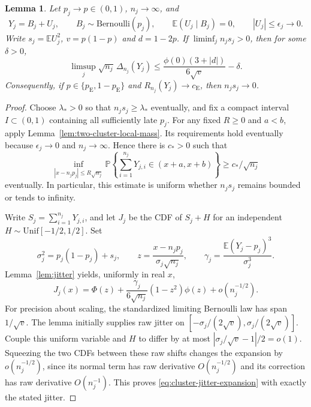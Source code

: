 \documentclass[aop]{imsart}
\theoremstyle{plain}
\newtheorem{lemma}[theorem]{Lemma}
\theoremstyle{definition}
\theoremstyle{definition}
\newcommand{\PP}{\mathbb P}
\newcommand{\EE}{\mathbb E}
\newcommand{\ce}{c_{\mathrm E}}
\newcommand{\pe}{p_{\mathrm E}}
\begin{document}
\begin{lemma}\label{lem:accumulated-cluster-variance}
Let $p_j\to p\in(0,1)$, $n_j\to\infty$, and
\[
 Y_j=B_j+U_j,\qquad B_j\sim\mathrm{Bernoulli}(p_j),\qquad
 \EE(U_j\mid B_j)=0,\qquad |U_j|\le\epsilon_j\to0.
\]
Write $s_j=\EE U_j^2$, $v=p(1-p)$ and $d=1-2p$.
If $\liminf_j n_js_j>0$, then for some $\delta>0$,
\begin{equation}\label{eq:macroscopic-gap}
 \limsup_j\sqrt{n_j}\,\Delta_{n_j}(Y_j)
 \le\frac{\phi(0)(3+|d|)}{6\sqrt v}-\delta.
\end{equation}
Consequently, if $p\in\{\pe,1-\pe\}$ and
$R_{n_j}(Y_j)\to\ce$, then $n_js_j\to0$.
\end{lemma}

\begin{proof}
Choose $\lambda_*>0$ so that $n_js_j\ge\lambda_*$ eventually,
and fix a compact interval $I\subset(0,1)$ containing all sufficiently
late $p_j$. For any fixed $R\ge0$ and $a<b$, apply
Lemma~\ref{lem:two-cluster-local-mass}. Its requirements hold eventually
because $\epsilon_j\to0$ and $n_j\to\infty$. Hence there is $c_*>0$
such that
\begin{equation}\label{eq:cluster-local-mass}
 \inf_{|x-n_jp_j|\le R\sqrt{n_j}}
 \PP\left\{\sum_{i=1}^{n_j}Y_{j,i}\in(x+a,x+b)\right\}
 \ge c_*/\sqrt{n_j}
\end{equation}
eventually. In particular, this estimate is uniform whether $n_js_j$
remains bounded or tends to infinity.

Write $S_j=\sum_{i=1}^{n_j}Y_{j,i}$, and let $J_j$ be the CDF of
$S_j+H$ for an independent $H\sim\mathrm{Unif}[-1/2,1/2]$.
Set
\[
 \sigma_j^2=p_j(1-p_j)+s_j,\qquad
 z=\frac{x-n_jp_j}{\sigma_j\sqrt{n_j}},\qquad
 \gamma_j=\frac{\EE(Y_j-p_j)^3}{\sigma_j^3}.
\]
Lemma~\ref{lem:jitter} yields, uniformly in real $x$,
\begin{equation}\label{eq:cluster-jitter-expansion}
 J_j(x)=\Phi(z)+\frac{\gamma_j}{6\sqrt{n_j}}
                   (1-z^2)\phi(z)+o(n_j^{-1/2}).
\end{equation}
For precision about scaling, the standardized limiting Bernoulli law
has span $1/\sqrt v$. The lemma initially supplies raw jitter on
$[-\sigma_j/(2\sqrt v),\sigma_j/(2\sqrt v)]$. Couple this uniform
variable and $H$ to differ by at most
$|\sigma_j/\sqrt v-1|/2=o(1)$. Squeezing the two CDFs between these
raw shifts changes the expansion by $o(n_j^{-1/2})$, since its normal
term has raw derivative $O(n_j^{-1/2})$ and its correction has raw
derivative $O(n_j^{-1})$. This proves
\eqref{eq:cluster-jitter-expansion} with exactly the stated jitter.


\end{proof}
\end{document}

